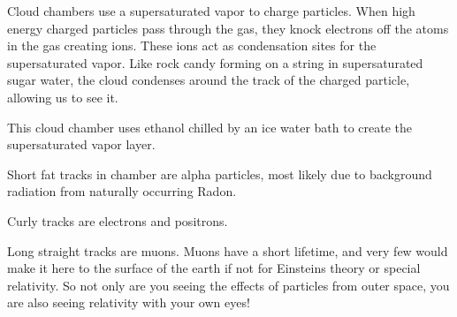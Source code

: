\documentclass[12pt]{article}
\begin{document}
Cloud chambers use a supersaturated vapor to charge particles.  When high energy charged particles pass through the gas, they knock electrons off the atoms in the gas creating ions.  These ions act as condensation sites for the supersaturated vapor.  Like rock candy forming on a string in supersaturated sugar water, the cloud condenses around the track of the charged particle, allowing us to see it. 

This cloud chamber uses ethanol chilled by an ice water bath to create the supersaturated vapor layer.

Short fat tracks in chamber are alpha particles, most likely due to background radiation from naturally occurring Radon.

Curly tracks are electrons and positrons.

Long straight tracks are muons.  Muons have a short lifetime, and very few would make it here to the surface of the earth if not for Einsteins theory or special relativity.  So not only are you seeing the effects of particles from outer space, you are also seeing relativity with your own eyes! 
\end{document}
